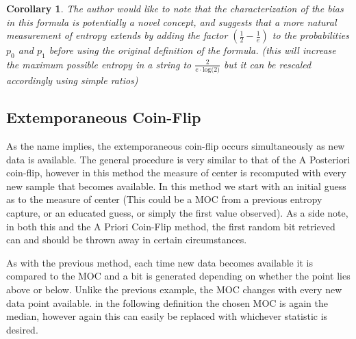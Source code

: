 \documentclass{IEEEtran}
\newtheorem{corollary}[theorem]{Corollary}
\begin{document}
\begin{corollary}
The author would like to note that the characterization of the bias in this formula is potentially a novel concept, and suggests that a more natural measurement of entropy extends by adding the factor $(\frac{1}{2} - \frac{1}{e})$ to the probabilities $p_0$ and $p_1$ before using the original definition of the formula. (this will increase the maximum possible entropy in a string to $\frac{2}{e \cdot \textrm{log(2)}}$ but it can be rescaled accordingly using simple ratios)
\end{corollary}

\subsection{Extemporaneous Coin-Flip}

As the name implies, the extemporaneous coin-flip occurs simultaneously as new data is available. The general procedure is very similar to that of the A Posteriori coin-flip, however in this method the measure of center is recomputed with every new sample that becomes available. In this method we start with an initial guess as to the measure of center (This could be a MOC from a previous entropy capture, or an educated guess, or simply the first value observed). As a side note, in both this and the A Priori Coin-Flip method, the first random bit retrieved can and should be thrown away in certain circumstances. 

As with the previous method, each time new data becomes available it is compared to the MOC and a bit is generated depending on whether the point lies above or below. Unlike the previous example, the MOC changes with every new data point available. in the following definition the chosen MOC is again the median, however again this can easily be replaced with whichever statistic is desired. 
\end{document}
